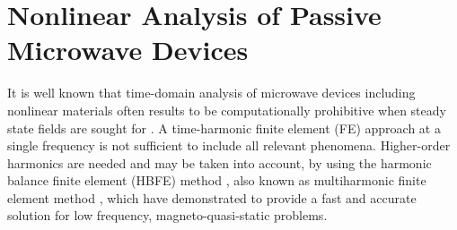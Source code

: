 %
%
%
%
%
%

\thispagestyle{empty}
\cleardoublepage
\graphicspath{{img/ch3/}}
\chapter[Nonlinear analysis]{Nonlinear Analysis of Passive Microwave Devices} \label{chap:NL}

It is well known that time-domain analysis of microwave devices including nonlinear materials often results to be computationally prohibitive when steady state fields are sought for \cite{deGersem2001}. A time-harmonic finite element (FE) approach at a single frequency is not sufficient to include all relevant phenomena. Higher-order harmonics are needed and may be taken into account, by using the harmonic balance finite element (HBFE) method \cite{yamada1988harmonic, yamada1989harmonic, yamada1991calculation}, also known as multiharmonic finite element method \cite{copeland2010domain, kolmbauer2012frequency}, which have demonstrated to provide a fast and accurate solution for low frequency, magneto-quasi-static problems.

